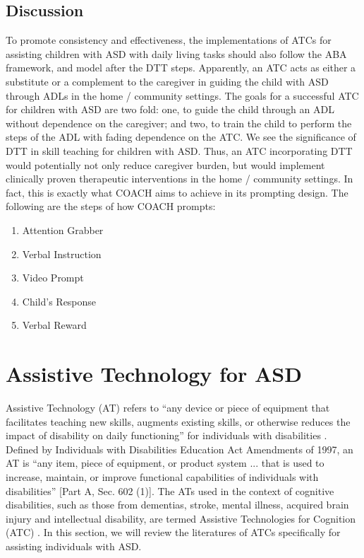 \documentclass{ut-thesis}
\begin{document}
\subsection{Discussion}
\label{sec:DTTDiscussion}
To promote consistency and effectiveness, the implementations of ATCs for assisting children with ASD with daily living tasks should also follow the ABA framework, and model after the DTT steps.  Apparently, an ATC acts as either a substitute or a complement to the caregiver in guiding the child with ASD through ADLs in the home / community settings.  The goals for a successful ATC for children with ASD are two fold: one, to guide the child through an ADL without dependence on the caregiver; and two, to train the child to perform the steps of the ADL with fading dependence on the ATC.  We see the significance of DTT in skill teaching for children with ASD.  Thus, an ATC incorporating DTT would potentially not only reduce caregiver burden, but would implement clinically proven therapeutic interventions in the home / community settings.  In fact, this is exactly what COACH aims to achieve in its prompting design.  The following are the steps of how COACH prompts:
\begin{enumerate}
	\item Attention Grabber
	\item Verbal Instruction
	\item Video Prompt
	\item Child's Response
	\item Verbal Reward
\end{enumerate}

\section{Assistive Technology for ASD}
Assistive Technology (AT) refers to ``any device or piece of equipment that facilitates teaching new skills, augments existing skills, or otherwise reduces the impact of disability on daily functioning'' for individuals with disabilities \cite{lang2014assistive}.  Defined by Individuals with Disabilities Education Act Amendments of 1997, an AT is ``any item, piece of equipment, or product system ... that is used to increase, maintain, or improve functional capabilities of individuals with disabilities'' [Part A, Sec. 602 (1)].  The ATs used in the context of cognitive disabilities, such as those from dementias, stroke, mental illness, acquired brain injury and intellectual disability, are termed Assistive Technologies for Cognition (ATC) \cite{frank2004assistive}.  In this section, we will review the literatures of ATCs specifically for assisting individuals with ASD.
\end{document}
